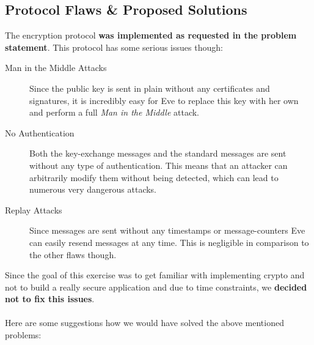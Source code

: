 \documentclass[11pt, a4paper]{article}
\begin{document}
\subsection{Protocol Flaws \& Proposed Solutions}

The encryption protocol \textbf{was implemented as requested in the problem
	statement}. This protocol has some serious issues though:

\begin{description}
	
	\item[Man in the Middle Attacks] Since the public key is sent in plain
	without any certificates and signatures, it is incredibly easy for Eve to
	replace this key with her own and perform a full \textit{Man in the Middle}
	attack.
	
	\item[No Authentication] Both the key-exchange messages and the standard
	messages are sent without any type of authentication. This means that an
	attacker can arbitrarily modify them without being detected, which can
	lead to numerous very dangerous attacks.
	
	\item[Replay Attacks] Since messages are sent without any timestamps or
	message-counters Eve can easily resend messages at any time. This is
	negligible in comparison to the other flaws though.
	
\end{description}

Since the goal of this exercise was to get familiar with implementing crypto
and not to build a really secure application and due to time constraints, we
\textbf{decided not to fix this issues}.
\\\\
Here are some suggestions how we would have solved the above mentioned problems:
\end{document}
